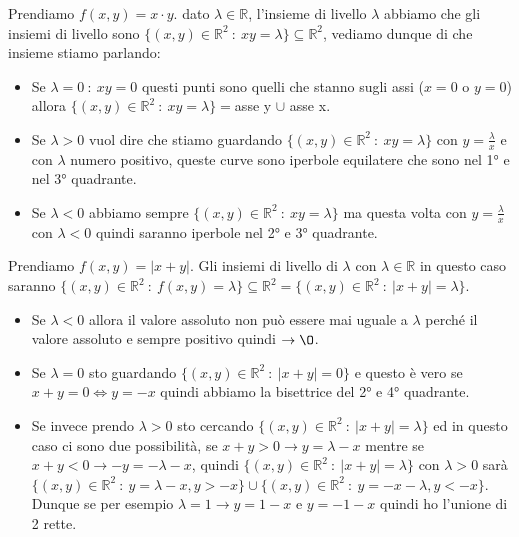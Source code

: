 \begin{example}\label{ess-insiemi-livello-2}
Prendiamo $f(x,y) = x\cdot y$. dato $\lambda \in \mathbb{R}$, l'insieme di livello $\lambda$ abbiamo che gli insiemi di livello sono $\{(x,y) \in \mathbb{R}^2 \::\: xy= \lambda\} \subseteq \mathbb{R}^2$, vediamo dunque di che insieme stiamo parlando:
\begin{itemize}
    \item Se $\lambda = 0 \::\: xy = 0$ questi punti sono quelli che stanno sugli assi ($x=0$ o $y=0$) allora $\{(x,y) \in \mathbb{R}^2 \::\: xy= \lambda\} = $asse y $\cup$ asse x.
    \item Se $\lambda > 0$ vuol dire che stiamo guardando $\{(x,y) \in \mathbb{R}^2 \::\: xy= \lambda\}$ con $y = \frac{\lambda}{x}$ e con $\lambda$ numero positivo, queste curve sono iperbole equilatere che sono nel 1° e nel 3° quadrante.
    \item Se $\lambda < 0$ abbiamo sempre $\{(x,y) \in \mathbb{R}^2 \::\: xy= \lambda\}$ ma questa volta con $y = \frac{\lambda}{x}$ con $\lambda < 0$ quindi saranno iperbole nel 2° e 3° quadrante.
\end{itemize}
\end{example}

\begin{example}\label{ess-insiemi-livello-3}
Prendiamo $f(x,y) = |x+y|$. Gli insiemi di livello di $\lambda$ con $\lambda \in \mathbb{R}$ in questo caso  saranno $\{(x,y) \in \mathbb{R}^2 \::\: f(x,y) = \lambda\} \subseteq \mathbb{R}^2 = \{(x,y) \in \mathbb{R}^2 \::\: |x+y| = \lambda\}$.
\begin{itemize}
    \item Se $\lambda < 0$ allora il valore assoluto non può essere mai uguale a $\lambda$ perché il valore assoluto e sempre positivo quindi $\to \O$.
    \item Se $\lambda = 0$ sto guardando $\{(x,y) \in \mathbb{R}^2 \::\: |x+y| = 0\}$ e questo è vero se $x+y = 0 \Longleftrightarrow y = -x$ quindi abbiamo la bisettrice del 2° e 4° quadrante.
    \item Se invece prendo $\lambda > 0$ sto cercando $\{(x,y) \in \mathbb{R}^2 \::\: |x+y| = \lambda\}$ ed in questo caso ci sono due possibilità, se $x+y > 0 \to y = \lambda - x$ mentre se $x+y < 0 \to -y = -\lambda-x$, quindi $\{(x,y) \in \mathbb{R}^2 \::\: |x+y| = \lambda\}$ con $\lambda > 0$ sarà $\{(x,y) \in \mathbb{R}^2 \::\: y = \lambda -x, y > -x \} \cup \{(x,y) \in \mathbb{R}^2 \::\: y = -x-\lambda, y < -x\}$.\\
    Dunque se per esempio $\lambda = 1 \to y = 1-x$ e $y = -1-x$ quindi ho l'unione di 2 rette.
\end{itemize}
\end{example}

